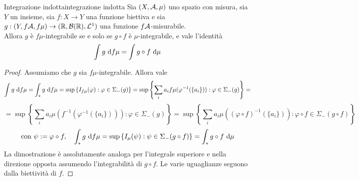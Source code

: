\documentclass{article}
\begin{document}
\begin{theorem}{Integrazione indotta}{integrazione indotta}
    Sia $(X,\mathcal{A},\mu)$ uno spazio con misura, sia $Y$ un insieme, sia $f:X\to Y$ una funzione biettiva e sia $g:(Y,f\mathcal{A},f\mu)\to (\mathbb{R},\mathcal{B}(\mathbb{R}),\mathcal{L}^1)$ una funzione $f\mathcal{A}$-misurabile.\\
    Allora $g$ è $f\mu$-integrabile se e solo se $g\circ f$ è $\mu$-integrabile, e vale l'identità
    \[\int g \text{ d} f\mu = \int g\circ f \text{ d} \mu\]
    \begin{proof}
        Assumiamo che $g$ sia $f\mu$-integrabile. Allora vale
        \[\int g \text{ d} f\mu = \int_* g \text{ d} f\mu = \sup\left\{I_{f\mu}(\varphi) : \varphi \in \Sigma_-(g)\right\}=\sup\left\{ \sum_i a_i f\mu(\varphi^{-1}(\{a_i\})) : \varphi \in \Sigma_-(g) \right\} =\]
        \[ = \sup\left\{ \sum_i a_i \mu(f^{-1}(\varphi^{-1}(\{a_i\}))) : \varphi \in \Sigma_-(g) \right\} = \sup\left\{ \sum_i a_i \mu((\varphi \circ f)^{-1}(\{a_i\})) : \varphi \circ f \in \Sigma_-(g\circ f) \right\}\]
        \[\text{con } \psi := \varphi \circ f, \quad \int_* g \text{ d} f\mu =\sup\left\{ I_\mu(\psi) : \psi \in \Sigma_-(g\circ f) \right\} = \int_* g \circ f \text{ d} \mu\]
        La dimostrazione è assolutamente analoga per l'integrale superiore e nella direzione opposta assumendo l'integrabilità di $g\circ f$. Le varie uguaglianze seguono dalla biettività di $f$.
    \end{proof}
\end{theorem}
\end{document}
